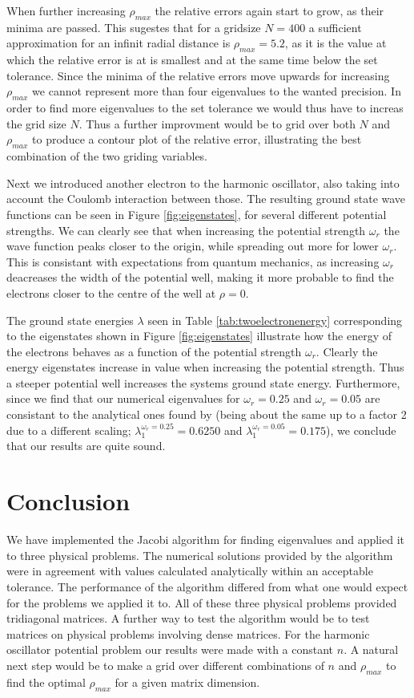 \documentclass[twocolumn]{aastex62}
\begin{document}
When further increasing $\rho_{max}$ the relative errors again start to grow, as their minima are passed. This sugestes that for a gridsize $N = 400$ a sufficient approximation for an infinit radial distance is $\rho_{max} = 5.2$, as it is the value at which the relative error is at is smallest and at the same time below the set tolerance. Since the minima of the relative errors move upwards for increasing $\rho_{max}$ we cannot represent more than four eigenvalues to the wanted precision. In order to find more eigenvalues to the set tolerance we would thus have to increas the grid size $N$. Thus a further improvment would be to grid over both $N$ and $\rho_{max}$ to produce a contour plot of the relative error, illustrating the best combination of the two griding variables.

Next we introduced another electron to the harmonic oscillator, also taking into account the Coulomb interaction between those. The resulting ground state wave functions can be seen in Figure \ref{fig:eigenstates}, for several different potential strengths. We can clearly see that when increasing the potential strength $\omega_r$ the wave function peaks closer to the origin, while spreading out more for lower $\omega_r$. This is consistant with expectations from quantum mechanics, as increasing $\omega_r$ deacreases the width of the potential well, making it more probable to find the electrons closer to the centre of the well at $\rho = 0$.

The ground state energies $\lambda$ seen in Table \ref{tab:twoelectronenergy} corresponding to the eigenstates shown in Figure \ref{fig:eigenstates} illustrate how the energy of the electrons behaves as a function of the potential strength $\omega_r$. Clearly the energy eigenstates increase in value when increasing the potential strength. Thus a steeper potential well increases the systems ground state energy. Furthermore, since we find that our numerical eigenvalues for $\omega_r = 0.25$ and $\omega_r = 0.05$ are consistant to the analytical ones found by \cite{taut:1993} (being about the same up to a factor 2 due to a different scaling; $\lambda_1^{\omega_r = 0.25} = 0.6250$ and $\lambda_1^{\omega_r = 0.05} = 0.175$), we conclude that our results are quite sound.

\section{Conclusion} \label{sec:conclusion}
We have implemented the Jacobi algorithm for finding eigenvalues and applied it to three physical problems. The numerical solutions provided by the algorithm were in agreement with values calculated analytically within an acceptable tolerance. The performance of the algorithm differed from what one would expect for the problems we applied it to. All of these three physical problems provided tridiagonal matrices. A further way to test the algorithm would be to test matrices on physical problems involving dense matrices. For the harmonic oscillator potential problem our results were made with a constant $n$. A natural next step would be to make a grid over different combinations of $n$ and $\rho_{max}$ to find the optimal $\rho_{max}$ for a given matrix dimension.
\end{document}
